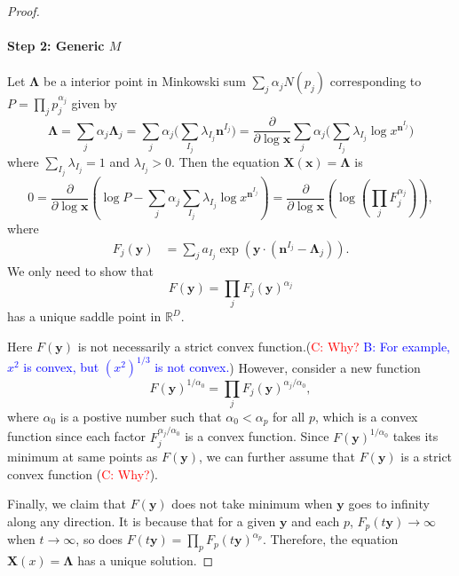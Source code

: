 \documentclass[12pt]{article}
\theoremstyle{definition}
\theoremstyle{plain}
\begin{document}
\begin{proof}
	\paragraph{Step 2: Generic $M$} Let $\mathbf{\Lambda}$ be a interior point in Minkowski sum $\sum_j \alpha_j N(p_{j})$ corresponding to $P=\prod_j p_{j}^{\alpha_{j}}$ given by 
	\[
		\mathbf{\Lambda}
		=\sum_j \alpha_j \mathbf{\Lambda}_j
		=\sum_j \alpha_{j} \biggl(\sum_{I_j}\lambda_{I_j}\mathbf{n}^{I_j}\biggr)
		=\frac{\partial}{\partial \log \mathbf{x}}\sum_{j}\alpha_j\biggl( \sum_{I_j}\lambda_{I_j} \log x^{\mathbf n^{I_j}}\biggr)
	\]
	where $\sum_{I_j} \lambda_{I_j}=1$ and $\lambda_{I_j} > 0$. Then the equation $\mathbf{X}(\mathbf{x})=\mathbf{\Lambda}$ is 
	\[
		0=\frac{\partial }{\partial \log \mathbf{x}}\left(
			\log P-\sum_{j}\alpha_j\sum_{I_j}\lambda_{I_j} \log x^{\mathbf n^{I_j}}
		\right)=\frac{\partial }{\partial \log \mathbf{x}}\left(
		\log \left(\prod_j F_{j}^{\alpha_{j}}\right)
		\right),
	\]
	where
	\[
		\begin{aligned}
			F_j(\mathbf y)&=\sum_{j} a_{I_{j}} \exp\left(\mathbf{y}\cdot \left(\mathbf{n}^{I_j}-\mathbf{\Lambda}_j\right)\right).
		\end{aligned}
	\]	
	We only need to show that
	\[
		F(\mathbf y)=\prod_j F_j(\mathbf{y})^{\alpha_j}	
	\]
	has a unique saddle point in $\mathds{R}^D$.
	
	Here $F(\mathbf y)$ is not necessarily a strict convex function.(\textcolor{red}{C: Why?} \textcolor{blue}{B: For example, $x^2$ is convex, but $(x^2)^{1/3}$ is not convex.}) However, consider a new function
	\[
		F(\mathbf y)^{1/\alpha_0}=\prod_j F_j(\mathbf y)^{\alpha_j/\alpha_0},
	\]
	where $\alpha_0$ is a postive number such that $\alpha_0< \alpha_p$ for all $p$, which is a convex function 
	since each factor $F_{j}^{\alpha_{j}/\alpha_{0}}$ is a convex function. Since $F(\mathbf y)^{1/\alpha_0}$ takes its minimum at same points as $F(\mathbf y)$, 
	we can further assume that $F(\mathbf y)$ is a strict convex function (\textcolor{red}{C: Why?}). 
	
	Finally, we claim that $F(\mathbf y)$ does not take minimum when $\mathbf{y}$ goes to infinity 
	along any direction. 
	It is because that for a given $\mathbf{y}$ and each $p$, $F_p(t\mathbf{y})\to \infty$ when $t\to \infty$,
	so does $F(t\mathbf{y})=\prod_p F_p(t\mathbf{y})^{\alpha_p}$. Therefore, the equation 
	$\mathbf{X}(x)=\mathbf{\Lambda}$ has a unique solution.
	\end{proof}
	












\end{document}
